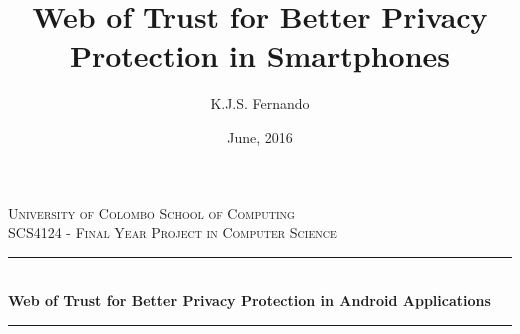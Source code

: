

\author{K.J.S. Fernando}
\title{Web of Trust for Better Privacy Protection in Smartphones}
\date{June, 2016}

\newcommand{\namesigdate}[2][5cm]{%
  \begin{tabular}{@{}p{#1}@{}}
    #2 \\[2\normalbaselineskip] \hrule \\[0pt]
    {\small \textit{Signature}} \\[2\normalbaselineskip] \hrule \\[0pt]
    {\small \textit{Date}}
  \end{tabular}
}

\frontmatter
\begin{titlepage}
\newcommand{\HRule}{\rule{\linewidth}{0.5mm}} %

\center %
 

\textsc{\LARGE University of Colombo School of Computing}\\[1.5cm] %
\textsc{\Large SCS4124 - Final Year Project in Computer Science}\\[0.5cm] %


\HRule \\[0.7cm]
{ \huge \bfseries Web of Trust for Better Privacy Protection in Android Applications}\\[0.7cm] %
\HRule \\[9cm]



\end{titlepage}
